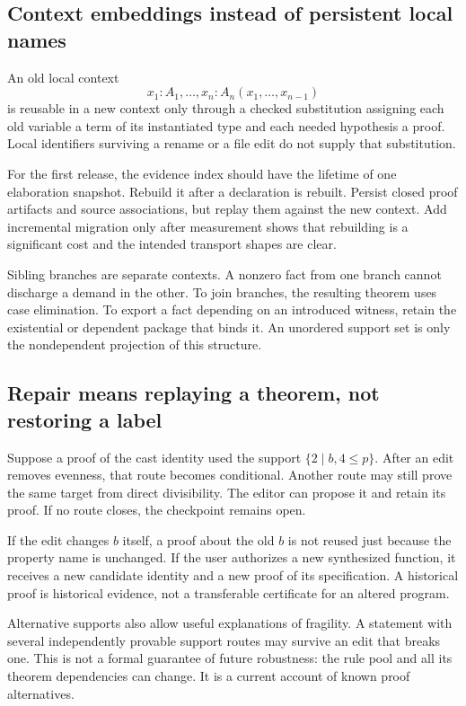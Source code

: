 \documentclass[11pt,a4paper]{article}
\theoremstyle{definition}\newtheorem{definition}[theorem]{Definition}
\theoremstyle{remark}\newtheorem{remark}[theorem]{Remark}
\begin{document}
\subsection{Context embeddings instead of persistent local names}
An old local context
\[
 x_1:A_1,\ldots,x_n:A_n(x_1,\ldots,x_{n-1})
\]
is reusable in a new context only through a checked substitution assigning each old variable a term of its instantiated type and each needed hypothesis a proof. Local identifiers surviving a rename or a file edit do not supply that substitution.

For the first release, the evidence index should have the lifetime of one elaboration snapshot. Rebuild it after a declaration is rebuilt. Persist closed proof artifacts and source associations, but replay them against the new context. Add incremental migration only after measurement shows that rebuilding is a significant cost and the intended transport shapes are clear.

Sibling branches are separate contexts. A nonzero fact from one branch cannot discharge a demand in the other. To join branches, the resulting theorem uses case elimination. To export a fact depending on an introduced witness, retain the existential or dependent package that binds it. An unordered support set is only the nondependent projection of this structure.

\subsection{Repair means replaying a theorem, not restoring a label}
Suppose a proof of the cast identity used the support $\{2\mid b,4\le p\}$. After an edit removes evenness, that route becomes conditional. Another route may still prove the same target from direct divisibility. The editor can propose it and retain its proof. If no route closes, the checkpoint remains open.

If the edit changes $b$ itself, a proof about the old $b$ is not reused just because the property name is unchanged. If the user authorizes a new synthesized function, it receives a new candidate identity and a new proof of its specification. A historical proof is historical evidence, not a transferable certificate for an altered program.

Alternative supports also allow useful explanations of fragility. A statement with several independently provable support routes may survive an edit that breaks one. This is not a formal guarantee of future robustness: the rule pool and all its theorem dependencies can change. It is a current account of known proof alternatives.
\end{document}
